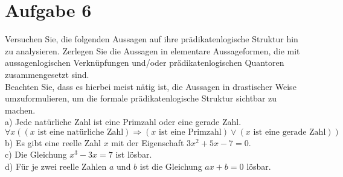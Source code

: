\section*{Aufgabe 6}

Versuchen Sie, die folgenden Aussagen auf ihre prädikatenlogische Struktur hin zu analysieren. Zerlegen Sie die Aussagen in elementare Aussageformen, die mit aussagenlogischen Verknüpfungen und/oder prädikatenlogischen Quantoren zusammengesetzt sind.\\

Beachten Sie, dass es hierbei meist nätig ist, die Aussagen in drastischer Weise umzuformulieren, um die formale prädikatenlogische Struktur sichtbar zu machen.\\

a) Jede natürliche Zahl ist eine Primzahl oder eine gerade Zahl.\\

$\forall x ((x \text{ ist eine natürliche Zahl}) \Rightarrow (x \text{ ist eine Primzahl}) \lor (x \text{ ist eine gerade Zahl}))$\\

b) Es gibt eine reelle Zahl $x$ mit der Eigenschaft $3x^2 + 5x - 7 = 0$.\\

c) Die Gleichung $x^3 - 3x = 7$ ist lösbar.\\

d) Für je zwei reelle Zahlen $a$ und $b$ ist die Gleichung $ax + b = 0$ lösbar.\\